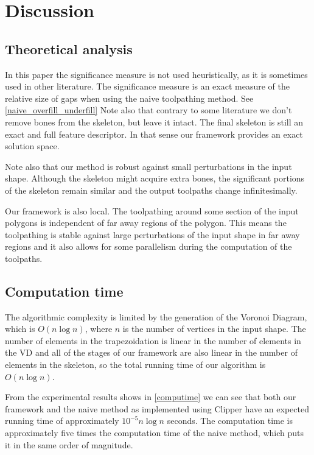 \section{Discussion}

\subsection{Theoretical analysis}
In this paper the significance measure is not used heuristically, as it is sometimes used in other literature.
The significance measure is an exact measure of the relative size of gaps when using the naive toolpathing method.
See \cref{naive_overfill_underfill}
Note also that contrary to some literature we don't remove bones from the skeleton, but leave it intact.
The final skeleton is still an exact and full feature descriptor.
In that sense our framework provides an exact solution space.

Note also that our method is robust against small perturbations in the input shape.
Although the skeleton might acquire extra bones, the significant portions of the skeleton remain similar and the output toolpaths change infinitesimally.

Our framework is also local.
The toolpathing around some section of the input polygons is independent of far away regions of the polygon.
This means the toolpathing is stable against large perturbations of the input shape in far away regions
and it also allows for some parallelism during the computation of the toolpaths.


\subsection{Computation time}
The algorithmic complexity is limited by the generation of the Voronoi Diagram, which is $O(n \log n)$, where $n$ is the number of vertices in the input shape.
The number of elements in the trapezoidation is linear in the number of elements in the VD
and all of the stages of our framework are also linear in the number of elements in the skeleton,
so the total running time of our algorithm is $O(n \log n)$.

From the experimental results shows in \cref{computime} we can see that both our framework and the naive method as implemented using Clipper have an expected running time of approximately $10^{-5} n \log n$ seconds.
The computation time is approximately five times the computation time of the naive method, which puts it in the same order of magnitude.

